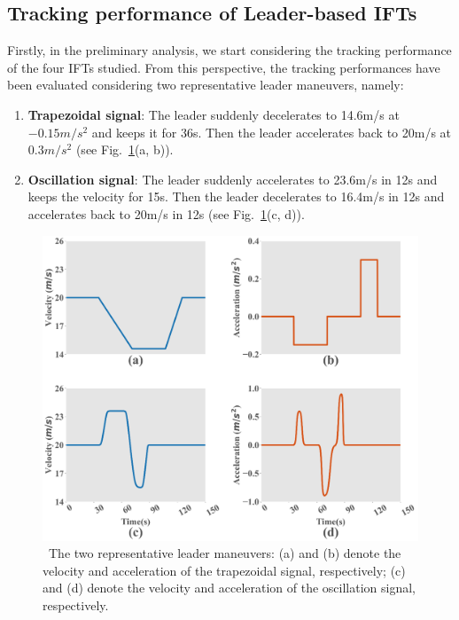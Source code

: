 \documentclass[a4paper]{cas-sc}
\begin{document}
\subsection{Tracking performance of Leader-based IFTs}

Firstly, in the preliminary analysis, we start considering the tracking performance of the four IFTs studied. From this perspective, the tracking performances have been evaluated considering two representative leader maneuvers, namely:
\begin{enumerate}
  \item \textbf{Trapezoidal signal}: The leader suddenly decelerates to 14.6m/s at $-0.15m/s^2$ and keeps it for 36s. Then the leader accelerates back to 20m/s at   $0.3m/s^2$ (see Fig.~\ref{fig3}(a, b)).
  \item \textbf{Oscillation signal}: The leader suddenly accelerates to 23.6m/s in 12s and keeps the velocity for 15s. Then the leader decelerates to 16.4m/s in 12s and accelerates back to 20m/s in 12s (see Fig.~\ref{fig3}(c, d)).
\end{enumerate}

\begin{figure}
  \centering
  \includegraphics[width=14cm]{figs/fig3.png}
  \caption{~The two representative leader maneuvers: (a) and (b) denote the velocity and acceleration of the trapezoidal signal, respectively; (c) and (d) denote the velocity and acceleration of the oscillation signal, respectively.}
  \label{fig3}
\end{figure}
\end{document}
